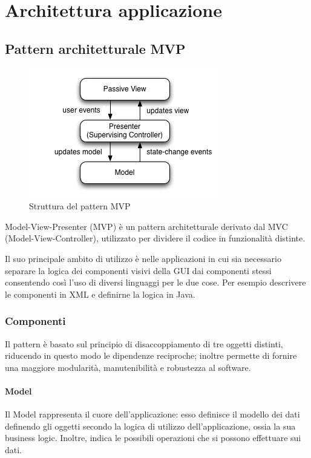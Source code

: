 \documentclass[../ManualeSviluppatore.tex]{subfiles}
\begin{document}
\section{Architettura applicazione}

	\subsection{Pattern architetturale MVP}
	\begin{figure}[!h]
		\centering
		\includegraphics[scale=0.6]{img/mvp}
			\caption{Struttura del pattern MVP}
		\label{fig:StrutturaMVP}
	\end{figure}
	
			Model-View-Presenter (MVP) è un pattern architetturale derivato dal MVC (Model-View-Controller), utilizzato per dividere il codice in funzionalità distinte. 
			
			Il suo principale ambito di utilizzo è nelle applicazioni in cui sia necessario separare la logica dei componenti visivi della GUI dai componenti stessi consentendo così l'uso di diversi linguaggi per le due cose. Per esempio  descrivere le componenti in XML e definirne la logica in \gls{Java}.
			
			\subsubsection{Componenti}
			Il pattern è basato sul principio di disaccoppiamento di tre oggetti distinti, riducendo in questo modo le dipendenze reciproche; inoltre permette di fornire una maggiore modularità, manutenibilità e robustezza al \gls{software}.
				\paragraph*{Model}
					Il Model rappresenta il cuore dell'applicazione: esso definisce il modello dei dati definendo gli oggetti secondo la logica di utilizzo dell'applicazione, ossia la sua business logic. Inoltre, indica le possibili operazioni che si possono effettuare sui dati.
					
\end{document}
